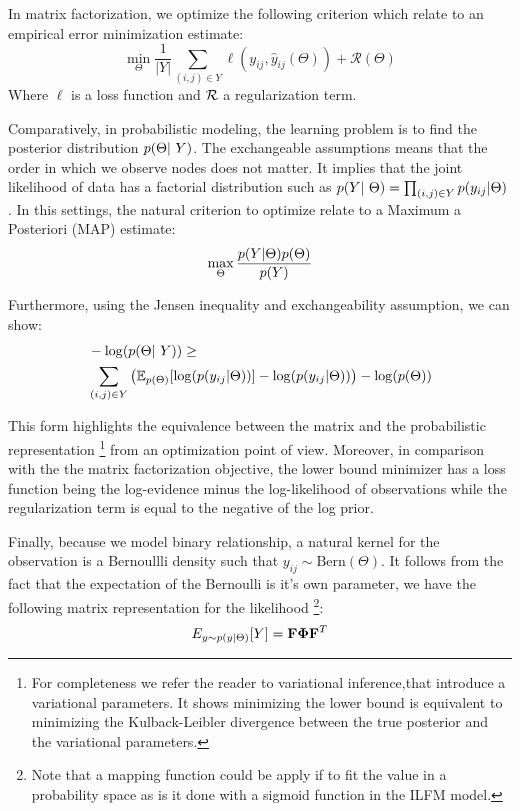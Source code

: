 In matrix factorization, we optimize the following criterion which relate to an empirical error minimization estimate:
\begin{displaymath}
    \min\limits_{\Theta} \frac{1}{|Y|} \sum_{(i,j) \in Y} \ell(y_{ij}, \hat y_{ij}(\Theta)) + \mathcal{R}(\Theta)
\end{displaymath}
Where $\ell$ is a loss function and $\cal R$ a regularization term.

Comparatively, in probabilistic modeling, the learning problem is to find the posterior distribution $\p(\Theta | Y)$. The exchangeable assumptions means that the order in which we observe nodes does not matter. It implies that the joint likelihood of data has a factorial distribution such as $\p(Y | \Theta) = \prod_{(i,j) \in Y} \p(y_{ij}| \Theta)$. In this settings, the natural criterion to optimize relate to a Maximum a Posteriori (MAP) estimate: 
\begin{displaymath}
    \max\limits_{\Theta}  \frac{p(Y | \Theta) p(\Theta)}{p(Y)}
\end{displaymath}

Furthermore, using the Jensen inequality and exchangeability assumption, we can show:
\begin{align}
    &- \log(\p(\Theta | Y)) \geq \nonumber \\  
    &\sum_{(i,j) \in Y} \left( \E_{p(\Theta)}[\log(\p(y_{ij}|\Theta))] - \log(\p(y_{ij}|\Theta)) \right) - \log(\p(\Theta))
\end{align}	


This form highlights the equivalence between the matrix and the probabilistic representation \footnote{For completeness we refer the reader to variational inference,that introduce a variational parameters. It shows minimizing the lower bound is equivalent to minimizing the Kulback-Leibler divergence between the true posterior and the variational parameters.} from an optimization point of view. Moreover, in comparison with the  the matrix factorization objective, the lower bound minimizer has a loss function being the log-evidence minus the log-likelihood of observations while the regularization term is equal to the negative of the log prior.


Finally, because we model binary relationship, a natural kernel for the observation is a Bernoullli density such that $y_{ij} \sim \text{Bern}(\Theta)$. It follows from the fact that the expectation of the Bernoulli is it's own parameter, we have the following matrix representation for the likelihood \footnote{Note that a mapping function could be apply if to fit the value in a probability space as is it done with a sigmoid function in the ILFM model.}:
\begin{equation}
E_{y \sim p(y \mid \Theta)}[Y] = \mathbf{F} \mathbf{\Phi}  \mathbf{F}^T
\end{equation}

